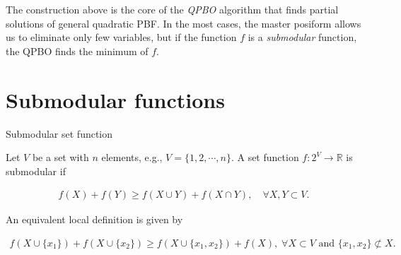 The construction above is the core of the \emph{QPBO} algorithm that finds partial solutions of general quadratic PBF. In the most cases, the master posiform allows us to eliminate only few variables, but if the function $f$ is a \emph{submodular} function, the QPBO finds the minimum of $f$.




\section{Submodular functions}
\label{ch2:sec:submodular-functions}

\begin{definition}{Submodular set function}

Let $V$ be a set with $n$ elements, e.g., $V=\{1,2,\cdots, n\}$. A set function $f:2^V\rightarrow \mathbb{R}$ is submodular if 

\begin{align}
	f(X) + f(Y) \geq f(X \cup Y) + f(X \cap Y),\quad \forall X,Y \subset V.
	\label{ch2:eq:submodular-set-function}
\end{align}

\end{definition}

An equivalent local definition is given by

\begin{align}
	f(X \cup \{x_1\}) + f(X \cup \{x_2\}) \geq f(X \cup \{x_1,x_2\}) + f(X), \; \forall X \subset V \text{ and } \{x_1,x_2\} \not\subset X.
	\label{ch2:eq:submodular-local}
\end{align}

